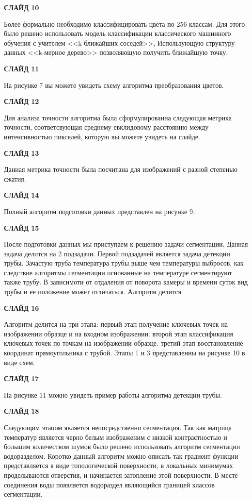 \documentclass[14pt, a4paper]{extreport}
\begin{document}
	\textbf{СЛАЙД 10}
	
	Более формально необходимо классифицировать цвета по 256 классам. Для этого было решено использовать модель классификации классического машинного обучения с учителем <<k ближайших соседей>>, Использующую структуру данных <<k-мерное дерево>> позволяющую получить ближайшую точку.
	
	\textbf{СЛАЙД 11}
	
	На рисунке 7 вы можете увидеть схему алгоритма преобразования цветов.
	
	
	\textbf{СЛАЙД 12}
	
	Для анализа точности алгоритма была сформулированна следующая метрика точности, соответсвующая среднему евклидовому расстоянию между интенсивностью пикселей, которую вы можете увидеть на слайде. 
	
	\textbf{СЛАЙД 13}
	
	Данная метрика точности была посчитана для изображений с разной степенью сжатия.
	
	\textbf{СЛАЙД 14}
	
	Полный алгоритм подготовки данных представлен на рисунке 9.
	
	\textbf{СЛАЙД 15}
	
	После подготовки данных мы приступаем к решению задачи сегментации. Данная задача делится на 2 подзадачи. Первой подзадачей является задача детекции трубы. Зачастую труба температура трубы выше чем температуры выбросов, как следствие алгоритмы сегментации основанные на температуре сегментируют также трубу. В зависимоти от отдаления от поворота камеры и времени суток вид трубы и ее положение может отличаться. Алгоритм делится 
	
	\textbf{СЛАЙД 16}
	
	 Алгоритм делится на три этапа: первый этап получение ключевых точек на изображении образце и на входном изображении. второй этап классификация ключевых точек по точкам на изображении образце. третий этап восстановление координат прямоугольника с трубой. Этапы 1 и 3 представленны на рисунке 10 в виде схем.
	 
	 \textbf{СЛАЙД 17}
	 
	 На рисунке 11 можно увидеть пример работы алгоритма детекции трубы.
	 
	 \textbf{СЛАЙД 18}
	 
	 Следующим этапом является непосредственно сегментация. Так как матрица температур является черно белым изображеним с низкой контрастностью и большим количеством шумов было решено использовать алгоритм сегментации водоразделом. Коротко данный алгоритм можно описать так градиент функции представляется в виде топологической поверхности, в локальных минимумах проделываются отверстия, и начинается затопление этой поверхности. В месте соединения воды появляется водораздел являющийся границей классов сегментации.
	 
\end{document}
